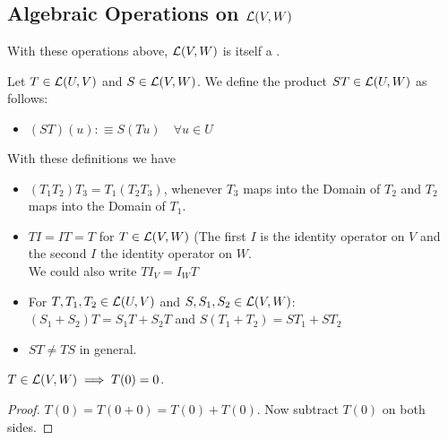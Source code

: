 \subsection{Algebraic Operations on $\mathcal{L}(V,W)$}

\setcounter{thm}{5}
\begin{thm}
  With these operations above, ${\mathcal{L}(V,W)}$ is itself a \vs.
\end{thm}

\setcounter{thm}{6}
\begin{mydef}
  Let $T \in {\mathcal{L}(U, V)}$ and $S \in {\mathcal{L}(V, W)}$. We define the product $ST \in {\mathcal{L}(U, W)}$ as follows:
  \begin{itemize}
    \item[] $(ST)(u) :\equiv S(Tu) \quad \forall u \in U$
  \end{itemize}
\end{mydef}

\begin{thm}
  With these definitions we have
  \begin{itemize}
    \item {} $(T_1 T_2) T_3 = T_1 (T_2 T_3)$, whenever $T_3$ maps into the Domain of $T_2$ and $T_2$ maps into the Domain of $T_1$.
    \item {} $T I = I T = T$ for $T \in {\mathcal{L}(V,W)}$ (The first $I$ is the identity operator on $V$ and the second $I$ the identity operator on $W$. \\
    We could also write $T I_V = I_W T$
    \item {} For $T, T_1, T_2 \in {\mathcal{L}(U, V)}$ and $S, S_1, S_2 \in {\mathcal{L}(V, W)}$: \\ $(S_1 + S_2)T=S_1 T + S_2 T$ and $S(T_1 + T_2)=S T_1 + S T_2$
    \item {} $ST \neq TS$ in general.
  \end{itemize}
\end{thm}

\setcounter{thm}{9}
\begin{thm}
  $T\in {\mathcal{L}(V,W)} \implies T(0)=0$.
\end{thm}
\begin{proof}
  $T(0) = T(0+0) = T(0) + T(0)$. Now subtract $T(0)$ on both sides.
\end{proof}